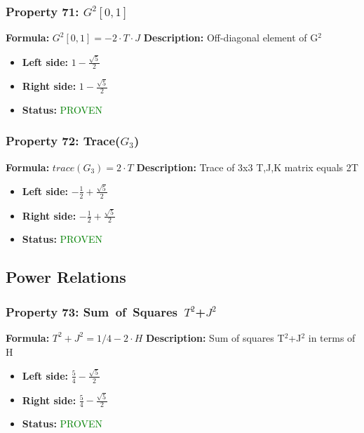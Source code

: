 \subsubsection*{Property 71: $G^{2}$$[0,1]$}
\textbf{Formula:} $G^2[0,1] = -2 \cdot T \cdot J$
\textbf{Description:} Off-diagonal element of G$^2$

\begin{itemize}
\item \textbf{Left side:} $1 - \frac{\sqrt{5}}{2}$
\item \textbf{Right side:} $1 - \frac{\sqrt{5}}{2}$
\item \textbf{Status:} \textcolor{green}{PROVEN}
\end{itemize}

\subsubsection*{Property 72: Trace($G_{3}$)}
\textbf{Formula:} $trace(G_3) = 2 \cdot T$
\textbf{Description:} Trace of 3x3 T,J,K matrix equals 2T

\begin{itemize}
\item \textbf{Left side:} $- \frac{1}{2} + \frac{\sqrt{5}}{2}$
\item \textbf{Right side:} $- \frac{1}{2} + \frac{\sqrt{5}}{2}$
\item \textbf{Status:} \textcolor{green}{PROVEN}
\end{itemize}


\subsection{Power Relations}

\subsubsection*{Property 73: Sum~of~Squares~$T^{2}$+$J^{2}$}
\textbf{Formula:} $T^2 + J^2 = 1/4 - 2 \cdot H$
\textbf{Description:} Sum of squares T$^2$+J$^2$ in terms of H

\begin{itemize}
\item \textbf{Left side:} $\frac{5}{4} - \frac{\sqrt{5}}{2}$
\item \textbf{Right side:} $\frac{5}{4} - \frac{\sqrt{5}}{2}$
\item \textbf{Status:} \textcolor{green}{PROVEN}
\end{itemize}

